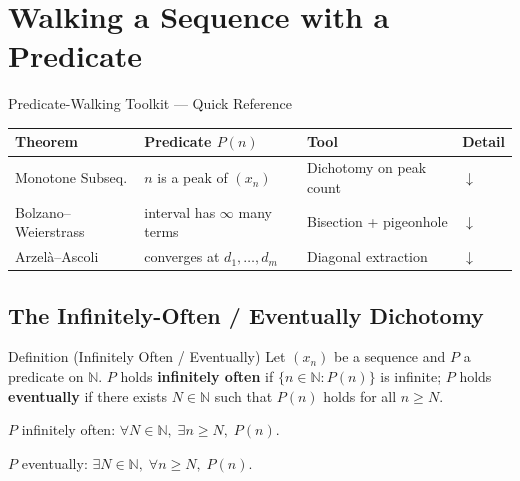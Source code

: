
\section{Walking a Sequence with a Predicate}
\label{sec:predicate-walking}

\begin{toolkitbox}{Predicate-Walking Toolkit --- Quick Reference}
\small
\begin{tabular}{l l l l}
\toprule
\textbf{Theorem} & \textbf{Predicate $P(n)$} & \textbf{Tool} & \textbf{Detail} \\
\midrule
Monotone Subseq.
  & $n$ is a peak of $(x_n)$
  & Dichotomy on peak count
  & \hyperref[thm:monotone-subsequence]{$\downarrow$} \\[3pt]
Bolzano--Weierstrass
  & interval has $\infty$ many terms
  & Bisection + pigeonhole
  & \hyperref[prop:bw-bisection]{$\downarrow$} \\[3pt]
Arzel\`a--Ascoli
  & converges at $d_1,\ldots,d_m$
  & Diagonal extraction
  & \hyperref[rem:arzela-ascoli]{$\downarrow$} \\
\bottomrule
\end{tabular}
\end{toolkitbox}

\subsection*{The Infinitely-Often / Eventually Dichotomy}
\label{subsec:io-ev-dichotomy}

\begin{definitionbox}{Definition (Infinitely Often / Eventually)}
\label{def:inf-often-eventually}
Let $(x_n)$ be a sequence and $P$ a predicate on $\mathbb{N}$. $P$ holds
\textbf{infinitely often} if $\{n\in\mathbb{N}:P(n)\}$ is infinite; $P$
holds \textbf{eventually} if there exists $N\in\mathbb{N}$ such that
$P(n)$ holds for all $n\geq N$.
\end{definitionbox}

\begin{remark}
$P$ infinitely often: $\forall N\in\mathbb{N},\;\exists n\geq N,\;P(n)$.

$P$ eventually: $\exists N\in\mathbb{N},\;\forall n\geq N,\;P(n)$.
\end{remark}

